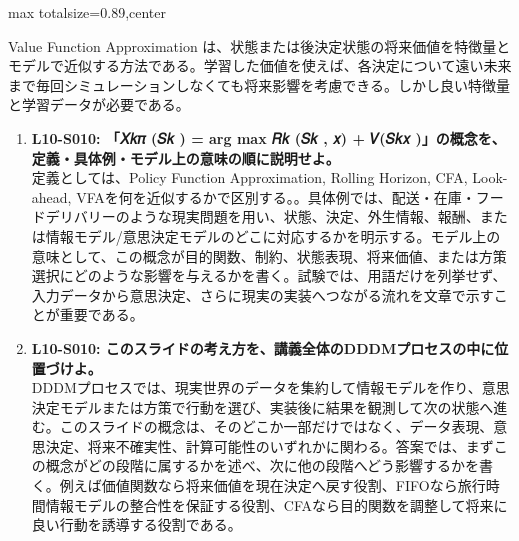 \begin{minipage}[t]{0.58\textwidth}
\begin{adjustbox}{max totalsize={\textwidth}{0.89\textheight},center}
\begin{minipage}{\textwidth}
Value Function Approximation は、状態または後決定状態の将来価値を特徴量とモデルで近似する方法である。学習した価値を使えば、各決定について遠い未来まで毎回シミュレーションしなくても将来影響を考慮できる。しかし良い特徴量と学習データが必要である。\par{}\begin{enumerate}\item \textbf{L10-S010: 「𝑋𝑘𝜋 (𝑆𝑘 ) = arg max 𝑅𝑘 (𝑆𝑘 , 𝑥) + 𝑉(𝑆𝑘𝑥 )」の概念を、定義・具体例・モデル上の意味の順に説明せよ。}\\定義としては、Policy Function Approximation, Rolling Horizon, CFA, Look-ahead, VFAを何を近似するかで区別する。。具体例では、配送・在庫・フードデリバリーのような現実問題を用い、状態、決定、外生情報、報酬、または情報モデル/意思決定モデルのどこに対応するかを明示する。モデル上の意味として、この概念が目的関数、制約、状態表現、将来価値、または方策選択にどのような影響を与えるかを書く。試験では、用語だけを列挙せず、入力データから意思決定、さらに現実の実装へつながる流れを文章で示すことが重要である。\item \textbf{L10-S010: このスライドの考え方を、講義全体のDDDMプロセスの中に位置づけよ。}\\DDDMプロセスでは、現実世界のデータを集約して情報モデルを作り、意思決定モデルまたは方策で行動を選び、実装後に結果を観測して次の状態へ進む。このスライドの概念は、そのどこか一部だけではなく、データ表現、意思決定、将来不確実性、計算可能性のいずれかに関わる。答案では、まずこの概念がどの段階に属するかを述べ、次に他の段階へどう影響するかを書く。例えば価値関数なら将来価値を現在決定へ戻す役割、FIFOなら旅行時間情報モデルの整合性を保証する役割、CFAなら目的関数を調整して将来に良い行動を誘導する役割である。\end{enumerate}
\end{minipage}
\end{adjustbox}
\end{minipage}


